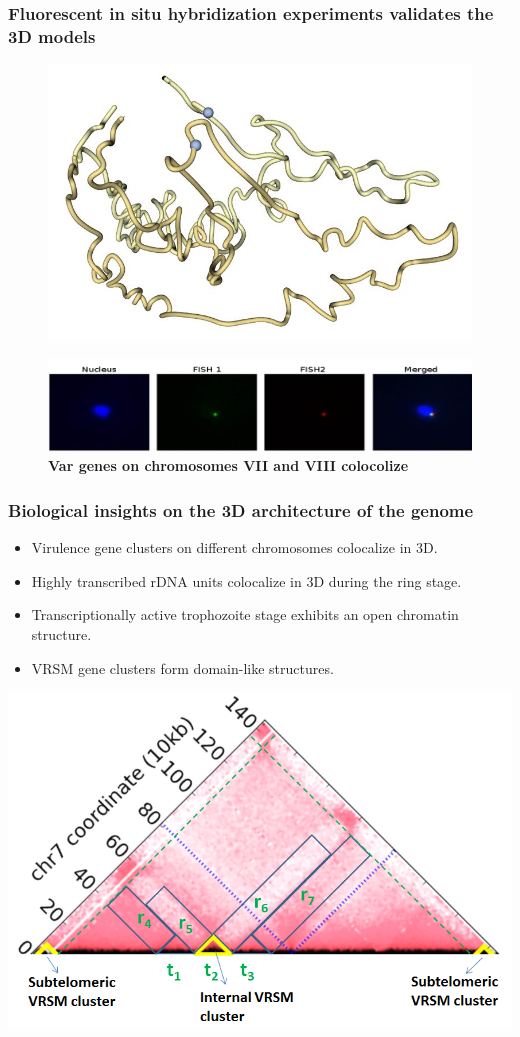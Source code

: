 \documentclass[xcolor=dvipsnames]{beamer}
\begin{document}
\begin{frame}
\frametitle{Fluorescent in situ hybridization experiments validates the 3D
models}
\begin{figure}
\includegraphics[scale=0.2]{figures/3D_FISH_1.jpg}
\end{figure}
\begin{figure}
\includegraphics[scale=0.45]{figures/FISH_1.jpg}
\caption{\textbf{Var genes on chromosomes VII and VIII colocolize}
}
\end{figure}
\end{frame}

\begin{frame}
\frametitle{Biological insights on the 3D architecture of the genome}

\begin{itemize}[label={$\bullet$}]

\item Virulence gene clusters on different chromosomes colocalize in 3D.
\item Highly transcribed rDNA units colocalize in 3D during the ring stage.
\item Transcriptionally active trophozoite stage exhibits an open chromatin
structure.
\item VRSM gene clusters form domain-like structures.
\end{itemize}

\begin{center}
\includegraphics[width=0.5\linewidth]{figures/plasmo_TAD.png}
\end{center}
\end{frame}
\end{document}
